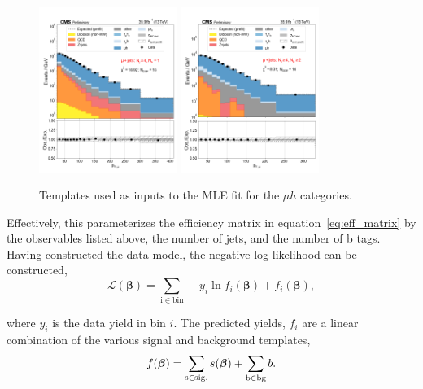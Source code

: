\begin{figure}[htb!]
    \centering
    \includegraphics[width=0.4\textwidth]{chapters/Analysis/sectionStatisticalAnalysis/figures/fit/mujet_cat_gt4_eq1}
    \includegraphics[width=0.4\textwidth]{chapters/Analysis/sectionStatisticalAnalysis/figures/fit/mujet_cat_gt4_gt2}
    \caption{Templates used as inputs to the MLE fit for the $\mu h$ categories.}
    \label{fig:mle_templates_mu4j}
\end{figure}


Effectively, this parameterizes the efficiency matrix in
equation~\ref{eq:eff_matrix} by the observables listed above, the number
of jets, and the number of b tags.  Having constructed the data model,
the negative log likelihood can be constructed,
\begin{equation}
\label{eq:nll}
\mathcal{L}(\boldsymbol{\beta}) = \sum_{\mathrm{i\in bin}} -y_{i}\ln
f_{i}(\boldsymbol{\beta}) + f_{i}(\boldsymbol{\beta}),
\end{equation}

where $y_{i}$ is the data yield in bin $i$.  The predicted yields,
$f_{i}$ are a linear combination of the various signal and background
templates, 
\begin{equation}
    f(\boldsymbol{\beta}) = \sum_{\rm s \in
    sig.}s(\boldsymbol{\beta}) + \sum_{\rm b\in bg} b.
\end{equation}

